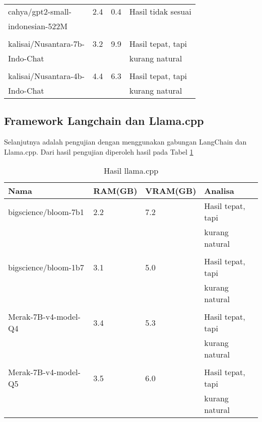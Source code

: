 \begin{table}[!htbp]
\begin{tabular}{llll}
      \\
      cahya/gpt2-small-         & 2.4      & 0.4       & Hasil tidak sesuai\\
      indonesian-522M \cite{cahya_llm}          &          &           &  \\
      \\
      kalisai/Nusantara-7b-     & 3.2      & 9.9       & Hasil tepat, tapi\\
      Indo-Chat \cite{zulfikar_aji_kusworo_2024}        &          &           & kurang natural \\
      \\
      kalisai/Nusantara-4b-     & 4.4      & 6.3       & Hasil tepat, tapi\\
      Indo-Chat  \cite{zulfikar_aji_kusworo_2024}               &          &           & kurang natural \\
      \bottomrule
    \end{tabular}
  \end{table}

\subsection{Framework Langchain dan Llama.cpp}
Selanjutnya adalah pengujian dengan menggunakan gabungan LangChain dan Llama.cpp. Dari hasil pengujian diperoleh hasil pada Tabel \ref{tab:hasilllama}
\begin{table}[!htbp]
    \caption{Hasil llama.cpp}
    \label{tab:hasilllama}
    \centering
    \begin{tabular}{llll}
    \toprule
    Nama                      & RAM(GB)  & VRAM(GB)  & Analisa  \\
    \midrule
    bigscience/bloom-7b1 \cite{muennighoff2022crosslingual}      & 2.2      & 7.2       & Hasil tepat, tapi\\
                              &          &           & kurang natural \\  
    \\
    bigscience/bloom-1b7 \cite{muennighoff2022crosslingual}      & 3.1      & 5.0       & Hasil tepat, tapi\\
                              &          &           & kurang natural \\ 
    \\ 
    Merak-7B-v4-model-Q4 \cite{Merak}     & 3.4      & 5.3       & Hasil tepat, tapi\\
                              &          &           & kurang natural \\  
    \\
    Merak-7B-v4-model-Q5 \cite{Merak}     & 3.5      & 6.0       & Hasil tepat, tapi\\
                              &          &           & kurang natural \\
    \bottomrule
  \end{tabular}
\end{table}


